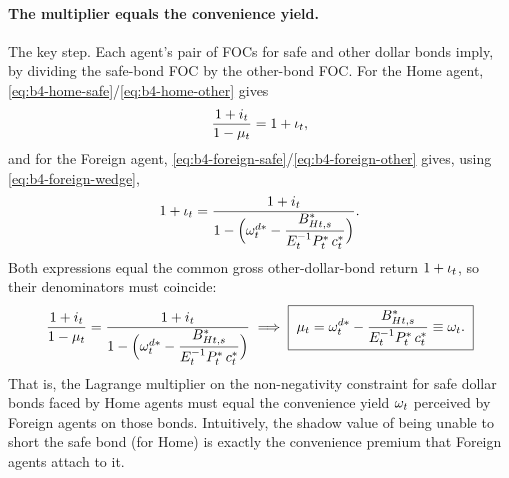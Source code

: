 \paragraph{The multiplier equals the convenience yield.} The key step. Each
agent's pair of FOCs for safe and other dollar bonds imply, by dividing the
safe-bond FOC by the other-bond FOC. For the Home agent,
\eqref{eq:b4-home-safe}/\eqref{eq:b4-home-other} gives
\begin{equation}
\frac{1+i_t}{1-\mu_t} = 1+\iota_t, \label{eq:b4-home-ratio}
\end{equation}
and for the Foreign agent,
\eqref{eq:b4-foreign-safe}/\eqref{eq:b4-foreign-other} gives, using
\eqref{eq:b4-foreign-wedge},
\begin{equation}
1+\iota_t = \frac{1+i_t}{1-\Bigl(\omega^{d*}_t-\dfrac{B^{*}_{Ht,s}}{E_t^{-1}P^{*}_t\,c^{*}_t}\Bigr)}. \label{eq:b4-foreign-ratio}
\end{equation}
Both expressions equal the common gross other-dollar-bond return $1+\iota_t$, so
their denominators must coincide:
\begin{equation}
\frac{1+i_t}{1-\mu_t}
= \frac{1+i_t}{1-\Bigl(\omega^{d*}_t-\dfrac{B^{*}_{Ht,s}}{E_t^{-1}P^{*}_t\,c^{*}_t}\Bigr)}
\;\Longrightarrow\;
\boxed{\;\mu_t = \omega^{d*}_t - \frac{B^{*}_{Ht,s}}{E_t^{-1}P^{*}_t\,c^{*}_t} \equiv \omega_t.\;} \label{eq:b4-mu-omega}
\end{equation}
That is, the Lagrange multiplier on the non-negativity constraint for safe dollar
bonds faced by Home agents must equal the convenience yield $\omega_t$ perceived by
Foreign agents on those bonds. Intuitively, the shadow value of being unable to
short the safe bond (for Home) is exactly the convenience premium that Foreign
agents attach to it.

